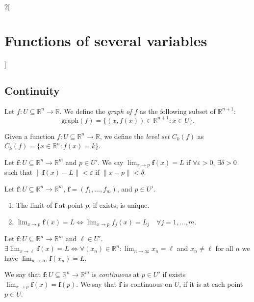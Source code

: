 \documentclass[../../../main.tex]{subfiles}
\begin{document}
\begin{multicols}{2}[\section{Functions of several variables}]
\subsection{Continuity}
\begin{definition}
Let $f:U\subseteq\mathbb{R}^n\rightarrow\mathbb{R}$. We define the \textit{graph of $f$} as the following subset of $\mathbb{R}^{n+1}$: $$\text{graph}(f)=\{(x,f(x))\in\mathbb{R}^{n+1}:x\in U\}.$$
\end{definition}
\begin{definition}
Given a function $f:U\subseteq\mathbb{R}^n\rightarrow\mathbb{R}$, we define the \textit{level set $C_k(f)$} as $C_k(f)=\{x\in\mathbb{R}^n:f(x)=k\}$.
\end{definition}
\begin{definition}
Let $\boldsymbol{f}:U\subseteq\mathbb{R}^n\rightarrow\mathbb{R}^m$ and $p\in U'$. We say $\displaystyle\lim_{x\to p}\boldsymbol{f}(x)=L$ if $\forall\varepsilon>0$, $\exists\delta>0$ such that $\|\mathbf{\boldsymbol{f}}(x)-L\|<\varepsilon$ if $\|x-p\|<\delta$.
\end{definition}
\begin{prop}
Let $\mathbf{\boldsymbol{f}}:U\subseteq\mathbb{R}^n\rightarrow\mathbb{R}^m$, $\mathbf{\boldsymbol{f}}=(f_1,\ldots,f_m)$, and $p\in U'$.
\begin{enumerate}
    \item The limit of $\mathbf{\boldsymbol{f}}$ at point $p$, if exists, is unique.
    \item $\displaystyle\lim_{x\to p}\mathbf{\boldsymbol{f}}(x)=L\iff\lim_{x\to p}f_j(x)=L_j\quad\forall j=1,\ldots,m$.
\end{enumerate}
\end{prop}
\begin{lemma}
Let $\mathbf{\boldsymbol{f}}:U\subseteq\mathbb{R}^n\rightarrow\mathbb{R}^m$ and $\ell\in U'$. $\displaystyle\exists\lim_{x\to \ell}\mathbf{\boldsymbol{f}}(x)=L\iff\forall(x_n)\in\mathbb{R}^n:\lim_{n\to\infty}x_n=\ell$ and $x_n\ne \ell$ for all $n$ we have $\displaystyle\lim_{n\to \infty}\mathbf{\boldsymbol{f}}(x_n)=L$.
\end{lemma}
\begin{definition}
We say that $\mathbf{\boldsymbol{f}}:U\subseteq\mathbb{R}^n\rightarrow\mathbb{R}^m$ is \textit{continuous} at $p\in U'$ if exists $\displaystyle\lim_{x\to p}\mathbf{\boldsymbol{f}}(x)=\mathbf{\boldsymbol{f}}(p)$. We say that $\mathbf{\boldsymbol{f}}$ is continuous on $U$, if it is at each point $p\in U$.
\end{definition}

\end{multicols}
\end{document}
